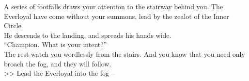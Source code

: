 A series of footfalls draws your attention to the stairway behind you. The Everloyal have come without your summons, lead by the zealot of the Inner Circle.\\

He descends to the landing, and spreads his hands wide.\\
“Champion. What is your intent?”\\

The rest watch you wordlessly from the stairs. And you know that you need only broach the fog, and they will follow.\\

>> Lead the Everloyal into the fog -- 